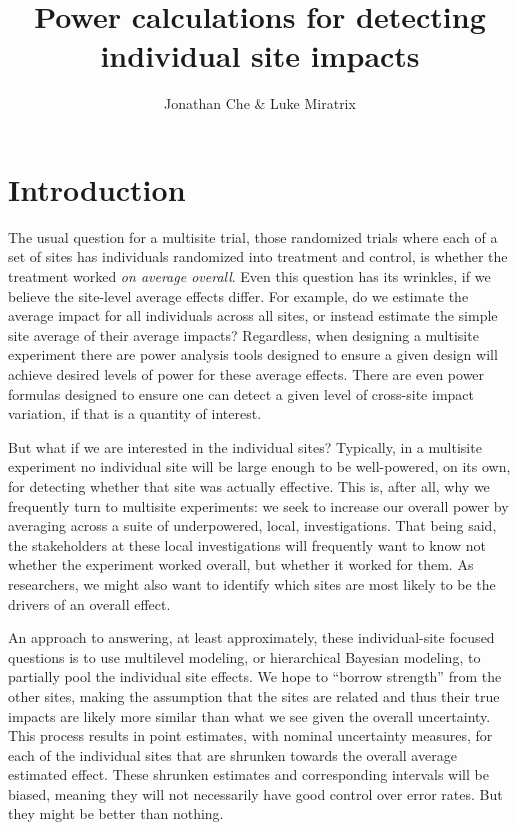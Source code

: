 \documentclass[]{article}
\title{Power calculations for detecting \\ individual site impacts}
\author{Jonathan Che \& Luke Miratrix}
\begin{document}
	
\maketitle



\section{Introduction}

The usual question for a multisite trial, those randomized trials where each of a set of sites has individuals randomized into treatment and control, is whether the treatment worked \emph{on average overall}.
Even this question has its wrinkles, if we believe the site-level average effects differ.
For example, do we estimate the average impact for all individuals across all sites, or instead estimate the simple site average of their average impacts?
Regardless, when designing a multisite experiment there are power analysis tools designed to ensure a given design will achieve desired levels of power for these average effects.
There are even power formulas designed to ensure one can detect a given level of cross-site impact variation, if that is a quantity of interest.

But what if we are interested in the individual sites?
Typically, in a multisite experiment no individual site will be large enough to be well-powered, on its own, for detecting whether that site was actually effective.
This is, after all, why we frequently turn to multisite experiments: we seek to increase our overall power by averaging across a suite of underpowered, local, investigations.
That being said, the stakeholders at these local investigations will frequently want to know not whether the experiment worked overall, but whether it worked for them.
As researchers, we might also want to identify which sites are most likely to be the drivers of an overall effect.

An approach to answering, at least approximately, these individual-site focused questions is to use multilevel modeling, or hierarchical Bayesian modeling, to partially pool the individual site effects.
We hope to ``borrow strength'' from the other sites, making the assumption that the sites are related and thus their true impacts are likely more similar than what we see given the overall uncertainty.
This process results in point estimates, with nominal uncertainty measures, for each of the individual sites that are shrunken towards the overall average estimated effect.
These shrunken estimates and corresponding intervals will be biased, meaning they will not necessarily have good control over error rates.
But they might be better than nothing.
\end{document}
